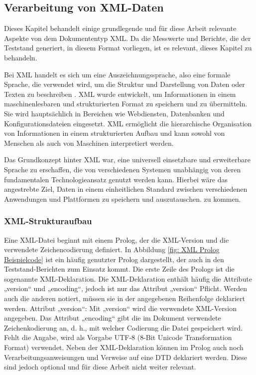 \subsection{Verarbeitung von XML-Daten}
\label{subsec:verarbeitung-von-xml-daten}
Dieses Kapitel behandelt einige grundlegende und für diese Arbeit relevante Aspekte von dem Dokumententyp \ac{XML}.
Da die Messwerte und Berichte, die der Teststand generiert, in diesem Format vorliegen, ist es relevant, dieses Kapitel zu behandeln.

Bei \ac{XML} handelt es sich um eine Auszeichnungssprache, also eine
formale Sprache, die verwendet wird, um die Struktur und Darstellung von Daten oder Texten zu beschreiben \cite*{Neumann2019}.
\ac{XML} wurde entwickelt, um Informationen in einem maschinenlesbaren und strukturierten Format zu speichern und zu übermitteln.
Sie wird hauptsächlich in Bereichen wie Webdiensten, Datenbanken und Konfigurationsdateien eingesetzt.
\ac{XML} ermöglicht die hierarchische Organisation von Informationen in einem strukturierten Aufbau und kann sowohl von Menschen
als auch von Maschinen interpretiert werden. \cite*[4]{PeterBrezany2003}

Das Grundkonzept hinter \ac{XML} war, eine universell einsetzbare und erweiterbare Sprache zu erschaffen, die von verschiedenen Systemen
unabhängig von deren fundamentalen Technologieansatz genutzt werden kann.
Hierbei wäre das angestrebte Ziel, Daten in einem einheitlichen Standard zwischen verschiedenen Anwendungen und Plattformen zu speichern und auszutauschen.
zu kommen. \cite*[3-5] {PeterBrezany2003}

\subsubsection{XML-Strukturaufbau}

Eine \ac{XML}-Datei beginnt mit einem Prolog, der die \ac{XML}-Version und die verwendete Zeichencodierung definiert.
In Abbildung \ref{fig: XML Prolog Beispielcode} ist ein häufig genutzter Prolog dargestellt, der auch in den Teststand-Berichten zum Einsatz kommt.
Die erste Zeile des Prologs ist die sogenannte \ac{XML}-Deklaration.
Die XML-Deklaration enthält häufig die Attribute „version“ und „encoding“, jedoch ist nur das Attribut „version“ Pflicht.
Werden auch die anderen notiert, müssen sie in der angegebenen Reihenfolge deklariert werden.
Attribut „version“: Mit „version“ wird die verwendete \ac{XML}-Version angegeben.
Das Attribut „encoding“ gibt die im Dokument verwendete Zeichenkodierung an, d. h., mit welcher Codierung die Datei gespeichert wird.
Fehlt die Angabe, wird als Vorgabe UTF-8 (8-Bit Unicode Transformation Format) verwendet.
Neben der \ac{XML}-Deklaration können im Prolog auch noch Verarbeitungsanweisungen und Verweise auf eine \ac{DTD} deklariert werden. Diese sind jedoch optional und für diese Arbeit nicht weiter relevant.
\cite*[8,9]{Becher2022}

